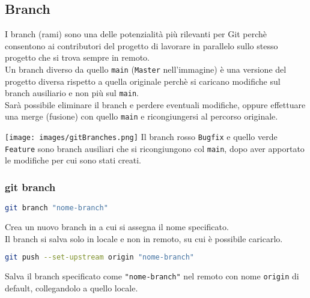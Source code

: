 \newpage
\subsection{Branch}
\nosyllab
\begin{minipage}{.48\textwidth}
	I branch (rami) sono una delle potenzialità più rilevanti per Git perchè consentono ai contributori del progetto di lavorare in parallelo sullo stesso progetto che si trova sempre in remoto.\\
	Un branch diverso da quello \texttt{main} (\texttt{Master} nell'immagine) è una versione del progetto diversa rispetto a quella originale perchè si caricano modifiche sul branch ausiliario e non più sul \texttt{main}.\\
	Sarà possibile eliminare il branch e perdere eventuali modifiche, oppure effettuare una merge (fusione) con quello \texttt{main} e ricongiungersi al percorso originale.
\end{minipage}
\hfil
\begin{minipage}{.48\textwidth}
	\texttt{[image: images/gitBranches.png]}
	Il branch rosso \texttt{Bugfix} e quello verde \texttt{Feature} sono branch ausiliari che si ricongiungono col \texttt{main}, dopo aver apportato le modifiche per cui sono stati creati.
\end{minipage}
\syllab

\subsubsection{git branch}
\begin{lstlisting}[language=bash]
	git branch "nome-branch"
\end{lstlisting}
Crea un nuovo branch in a cui si assegna il nome specificato.\\
Il branch si salva solo in locale e non in remoto, su cui è possibile caricarlo.\\

\begin{lstlisting}[language=bash]
	git push --set-upstream origin "nome-branch"
\end{lstlisting}
Salva il branch specificato come \texttt{\color{blue!70!black}"nome-branch"} nel remoto con nome \texttt{origin} di default, collegandolo a quello locale.\\

